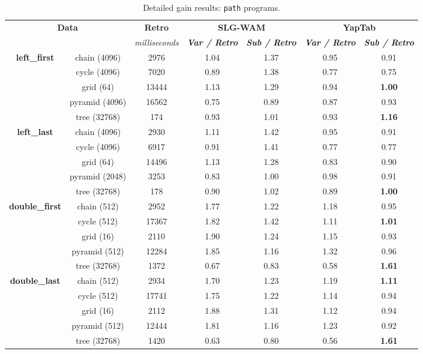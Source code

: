 \begin{table}[ht]
\centering
\footnotesize{
  \begin{tabular}{cc|c|cc|cc}
   \hline
    \hline
    \multicolumn{2}{c|}{\multirow{2}{*}{\small{\textbf{Data}}}} & \textbf{\small{Retro}} & \multicolumn{2}{c|}{\small{\textbf{SLG-WAM}}} & \multicolumn{2}{c}{\small{\textbf{YapTab}}} \\
     \multicolumn{2}{c|}{} & \scriptsize{\textit{milliseconds}} & \textbf{\textit{\scriptsize{Var / Retro}}} & \textbf{\textit{\scriptsize{Sub / Retro}}} & \textbf{\textit{\scriptsize{Var / Retro}}} & \textbf{\textit{\scriptsize{Sub / Retro}}} \\
   \hline
   \hline
   \multirow{5}{*}{\textbf{left\_first}} &  chain  (4096)  &  2976 &  1.04  &  1.37  &  0.95 &  0.91 \\
   &  cycle  (4096)  &  7020 &  0.89  &  1.38  &  0.77 &  0.75 \\
   &  grid  (64)  &  13444 &  1.13  &  1.29  &  0.94 &  \textbf{1.00} \\
   &  pyramid  (4096)  &  16562 &  0.75  &  0.89  &  0.87 &  0.93 \\
   &  tree  (32768)  &  174 &  0.93  &  1.01  &  0.93 &  \textbf{1.16} \\
   \hline
   \multirow{5}{*}{\textbf{left\_last}} &  chain  (4096)  &  2930 &  1.11  &  1.42  &  0.95 &  0.91 \\
   &  cycle  (4096)  &  6917 &  0.91  &  1.41  &  0.77 &  0.77 \\
   &  grid  (64)  &  14496 &  1.13  &  1.28  &  0.83 &  0.90 \\
   &  pyramid  (2048)  &  3253 &  0.83  &  1.00  &  0.98 &  0.91 \\
   &  tree  (32768)  &  178 &  0.90  &  1.02  &  0.89 &  \textbf{1.00} \\
   \hline
   \multirow{5}{*}{\textbf{double\_first}} &  chain  (512)  &  2952 &  1.77  &  1.22  &  1.18 &  0.95 \\
   &  cycle  (512)  &  17367 &  1.82  &  1.42  &  1.11 &  \textbf{1.01} \\
   &  grid  (16)  &  2110 &  1.90  &  1.24  &  1.15 &  0.93 \\
   &  pyramid  (512)  &  12284 &  1.85  &  1.16  &  1.32 &  0.96 \\
   &  tree  (32768)  &  1372 &  0.67  &  0.83  &  0.58 &  \textbf{1.61} \\
   \hline
   \multirow{5}{*}{\textbf{double\_last}} &  chain  (512)  &  2934 &  1.70  &  1.23  &  1.19 &  \textbf{1.11} \\
   &  cycle  (512)  &  17741 &  1.75  &  1.22  &  1.14 &  0.94 \\
   &  grid  (16)  &  2112 &  1.88  &  1.31  &  1.12 &  0.94 \\
   &  pyramid  (512)  &  12444 &  1.81  &  1.16  &  1.23 &  0.92 \\
   &  tree  (32768)  &  1420 &  0.63  &  0.80  &  0.56 &  \textbf{1.61} \\
   \hline

\hline
\end{tabular}
}
\caption{Detailed gain results: \texttt{path} programs.}
\label{tbl:results_detail_gain_tst}
\end{table}
